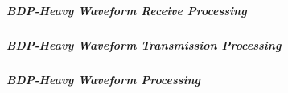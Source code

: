 \subparagraph{BDP-Heavy \FM Waveform Receive Processing}
\label{Waveform_FM_Receive_Heavy}




\subparagraph{BDP-Heavy \FM Waveform Transmission Processing}
\label{Waveform_FM_Transmission_Heavy}




\subparagraph{BDP-Heavy \FM Waveform \VSWR Processing}
\label{Waveform_FM_VSWR_Heavy}

